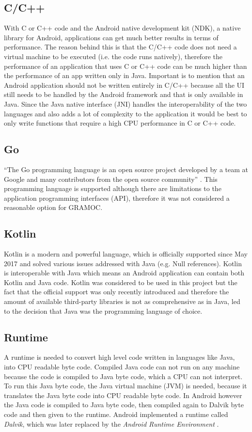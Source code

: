 \subsection{C/C++}
With C or C++ code and the Android native development kit (NDK), a native library for Android, applications can get much better results in terms of performance. The reason behind this is that the C/C++ code does not need a virtual machine to be executed (i.e. the code runs natively), therefore the performance of an application that uses C or C++ code can be much higher than the performance of an app written only in Java. Important is to mention that an Android application should not be written entirely in C/C++ because all the UI still needs to be handled by the Android framework and that is only available in Java. Since the Java native interface (JNI) handles the interoperability of the two languages and also adds a lot of complexity to the application it would be best to only write functions that require a high CPU performance in C or C++ code.

\subsection{Go}
``The Go programming language is an open source project developed by a team at Google and many contributors from the open source community'' \autocite{GoProject}. This programming language is supported although there are limitations to the application programming interfaces (API), therefore it was not considered a reasonable option for GRAMOC.

\subsection{Kotlin}
Kotlin is a modern and powerful language, which is officially supported since May 2017 and solved various issues addressed with Java (e.g. Null references). Kotlin is interoperable with Java which means an Android application can contain both Kotlin and Java code. Kotlin was considered to be used in this project but the fact that the official support was only recently introduced and therefore the amount of available third-party libraries is not as comprehensive as in Java, led to the decision that Java was the programming language of choice.

\subsection{Runtime}
A runtime is needed to convert high level code written in languages like Java, into CPU readable byte code. Compiled Java code can not run on any machine because the code is compiled to Java byte code, which a CPU can not interpret. To run this Java byte code, the Java virtual machine (JVM) is needed, because it translates the Java byte code into CPU readable byte code. In Android however the Java code is compiled to Java byte code, then compiled again to Dalvik byte code and then given to the runtime. Android implemented a runtime called \textit{Dalvik}, which was later replaced by the \textit{Android Runtime Environment} \autocite{artanddalvik}.

